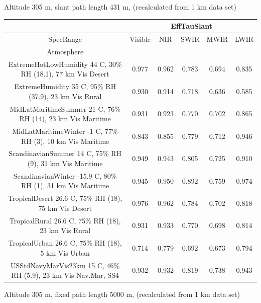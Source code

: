 \documentclass{workpackage}
\begin{document}
Altitude 305 m, slant path length 431 m, (recalculated from 1 km data set)


\begin{center}

\begin{footnotesize}

\begin{tabular}{|c|c|c|c|c|c|}
\hline
&\multicolumn{5}{|c|}{EffTauSlant}\\\hline
SpecRange&Visible&NIR&SWIR&MWIR&LWIR\\\hline
Atmosphere&&&&&\\\hline
ExtremeHotLowHumidity 44 C, 30\% RH (18.1), 77 km Vis Desert&0.977&0.962&0.783&0.694&0.835\\\hline
ExtremeHumidity 35 C, 95\% RH (37.9), 23 km Vis Rural&0.930&0.914&0.718&0.636&0.585\\\hline
MidLatMaritimeSummer 21 C, 76\% RH (14), 23 km Vis Maritime&0.931&0.923&0.770&0.702&0.865\\\hline
MidLatMaritimeWinter -1 C, 77\% RH (3), 10 km Vis Maritime&0.843&0.855&0.779&0.712&0.946\\\hline
ScandinavianSummer 14 C, 75\% RH (9), 31 km Vis Maritime&0.949&0.943&0.805&0.725&0.910\\\hline
ScandinavianWinter -15.9 C, 80\% RH (1), 31 km Vis Maritime&0.945&0.950&0.892&0.759&0.974\\\hline
TropicalDesert 26.6 C, 75\% RH (18), 75 km Vis Desert&0.976&0.962&0.784&0.702&0.818\\\hline
TropicalRural 26.6 C, 75\% RH (18), 23 km Vis Rural&0.931&0.933&0.770&0.698&0.814\\\hline
TropicalUrban 26.6 C, 75\% RH (18), 5 km Vis Urban&0.714&0.779&0.692&0.673&0.794\\\hline
USStdNavyMarVis23km 15 C, 46\% RH (5.9), 23 km Vis Nav.Mar, SS4&0.932&0.932&0.819&0.738&0.943\\\hline

\end{tabular}
\end{footnotesize}
\end{center}

Altitude 305 m, fixed path length 5000 m, (recalculated from 1 km data set)
\end{document}
